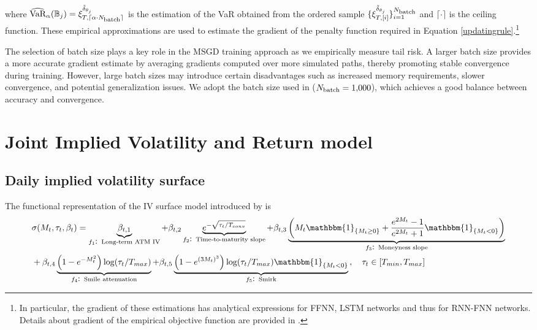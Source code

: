 where $\widehat{\mbox{VaR}}_{\alpha}(\mathbb{B}_{j})=\xi_{T,\lceil \alpha \cdot N_{\mbox{\scriptsize{batch}}} \rceil}^{\tilde{\delta}_{\theta_{j}}}$ is the estimation of the VaR obtained from the ordered sample $\{ \xi_{T,[i]}^{\tilde{\delta}_{\theta_{j}}} \}_{i=1}^{N_{\mbox{\scriptsize{batch}}}}$ and $\lceil \cdot \rceil$ is the ceiling function. These empirical approximations are used to estimate the gradient of the penalty function required in Equation \eqref{updatingrule}.\footnote{In particular, the gradient of these estimations has analytical expressions for FFNN, LSTM networks and thus for RNN-FNN networks. Details about gradient of the empirical objective function are provided in \cite{goodfellow2016deep}.} %

The selection of batch size plays a key role in the MSGD training approach as we empirically measure tail risk. A larger batch size provides a more accurate gradient estimate by averaging gradients computed over more simulated paths, thereby promoting stable convergence during training. However, large batch sizes may introduce certain disadvantages such as increased memory requirements, slower convergence, and potential generalization issues. We adopt the batch size used in \cite{carbonneau2021deep} ($N_{\mbox{\scriptsize{batch}}}=1,\!000$), which achieves a good balance between accuracy and convergence.


\section{Joint Implied Volatility and Return model}\label{appen:JIVR}

\subsection{Daily implied volatility surface}\label{subappen:IVsurface}

The functional representation of the IV surface model introduced by \cite{Frnacois2022} is
\begin{align}
     & \sigma (M_{t},\tau_{t},\beta_{t}) =  \underbrace{\beta_{t,1}}_{f_{1}\mbox{: \scriptsize{Long-term ATM IV}}} +  \beta_{t,2}\underbrace{e^{-\sqrt{\tau_{t} /T_{conv}}}}_{f_{2}\mbox{: \scriptsize{Time-to-maturity slope}}} + \beta_{t,3}\underbrace{\left( M_{t}\mathbbm{1}_{\{ M_{t}\geq 0 \}} + \frac{e^{2M_{t}}-1}{e^{2M_{t}}+1}\mathbbm{1}_{\{M_{t}< 0\}} \right)}_{f_{3}\mbox{: \scriptsize{Moneyness slope}}} \nonumber\\
     & + \beta_{t,4}\underbrace{\left( 1-e^{-M_{t}^{2}} \right)\mbox{log}(\tau_{t}/T_{max})}_{f_{4}\mbox{: \scriptsize{Smile attenuation}}}+\beta_{t,5}\underbrace{\left( 1-e^{(3M_{t})^{3}} \right)\mbox{log}(\tau_{t}/T_{max})\mathbbm{1}_{\{M_{t}< 0\}}}_{f_{5}\mbox{: \scriptsize{Smirk}}}\, , \quad \tau_{t} \in [T_{min},T_{max}] 
     \label{full_5factormodel}
\end{align}

